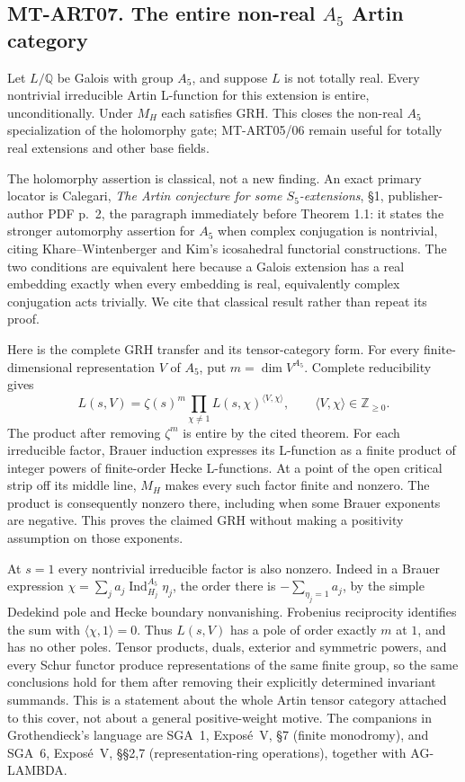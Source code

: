 \subsection*{MT-ART07. The entire non-real $A_5$ Artin category}
Let $L/\mathbb Q$ be Galois with group $A_5$, and suppose $L$ is not
totally real. Every nontrivial irreducible Artin L-function for this
extension is entire, unconditionally. Under $M_H$ each satisfies GRH.
This closes the non-real $A_5$ specialization of the holomorphy gate;
MT-ART05/06 remain useful for totally real extensions and other base fields.

The holomorphy assertion is classical, not a new finding. An exact primary
locator is Calegari, \emph{The Artin conjecture for some $S_5$-extensions},
\S1, publisher-author PDF p.~2, the paragraph immediately before
Theorem 1.1: it states the stronger automorphy assertion for $A_5$ when
complex conjugation is nontrivial, citing Khare--Wintenberger and Kim's
icosahedral functorial constructions. The two conditions are equivalent
here because a Galois extension has a real embedding exactly when every
embedding is real, equivalently complex conjugation acts trivially.
We cite that classical result rather than repeat its proof.

Here is the complete GRH transfer and its tensor-category form.
For every finite-dimensional representation $V$ of $A_5$, put
$m=\dim V^{A_5}$. Complete reducibility gives
\[
 L(s,V)=\zeta(s)^m
          \prod_{\chi\ne1}L(s,\chi)^{\langle V,\chi\rangle},
 \qquad \langle V,\chi\rangle\in\mathbb Z_{\ge0}.
\]
The product after removing $\zeta^m$ is entire by the cited theorem.
For each irreducible factor, Brauer induction expresses its L-function
as a finite product of integer powers of finite-order Hecke L-functions.
At a point of the open critical strip off its middle line, $M_H$ makes
every such factor finite and nonzero. The product is consequently nonzero
there, including when some Brauer exponents are negative. This proves
the claimed GRH without making a positivity assumption on those exponents.

At $s=1$ every nontrivial irreducible factor is also nonzero. Indeed in a
Brauer expression $\chi=\sum_j a_j\operatorname{Ind}_{H_j}^{A_5}\eta_j$,
the order there is $-\sum_{\eta_j=1}a_j$, by the simple Dedekind pole and
Hecke boundary nonvanishing. Frobenius reciprocity identifies the sum with
$\langle\chi,1\rangle=0$. Thus $L(s,V)$ has a pole of order exactly $m$
at $1$, and has no other poles. Tensor products, duals, exterior and
symmetric powers, and every Schur functor produce representations of the
same finite group, so the same conclusions hold for them after removing
their explicitly determined invariant summands. This is a statement about
the whole Artin tensor category attached to this cover, not about a
general positive-weight motive. The companions in Grothendieck's language
are SGA~1, Expos\'e~V, \S7 (finite monodromy), and SGA~6, Expos\'e~V,
\S\S2,7 (representation-ring operations), together with AG-LAMBDA.

